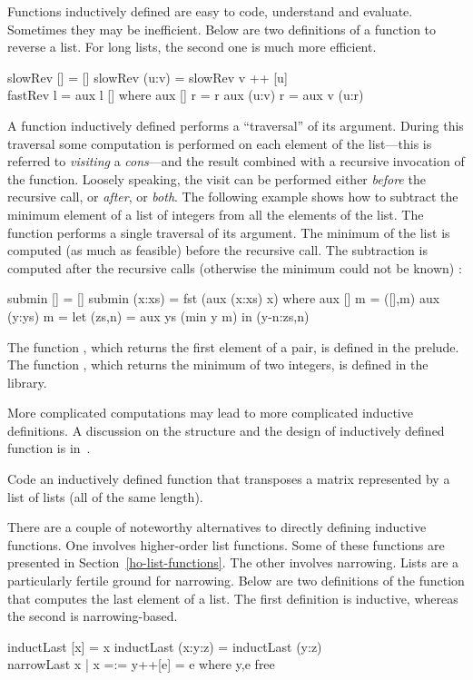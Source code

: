 Functions inductively defined are easy
to code, understand and evaluate.  Sometimes they may be inefficient.
Below are two definitions of a function to reverse a list.
For long lists, the second one is much more efficient.
%
\begin{prog}
slowRev [] = []
slowRev (u:v) = slowRev v ++ [u] \\[-2ex]
fastRev l = aux l []
  where aux [] r = r
        aux (u:v) r = aux v (u:r)
\end{prog}
%
A function inductively defined performs a ``traversal'' of its argument.
During this traversal some computation is performed on each
element of the list---this is referred to \emph{visiting}
a \emph{cons}---and the result combined with a
recursive invocation of the function.
Loosely speaking, the visit
can be performed either \emph{before} the recursive call,
or \emph{after}, or \emph{both}.
The following example shows how to subtract the minimum element of
a list of integers from all the elements of the list.
The function performs a single traversal of its argument.
The minimum of the list is computed (as much as feasible) before
the recursive call.
The subtraction is computed after the recursive
calls (otherwise the minimum could not be known)
:
%
\begin{prog}
submin [] = []
submin (x:xs) = fst (aux (x:xs) x)
  where aux []     m = ([],m)
        aux (y:ys) m = let (zs,n) = aux ys (min y m)
                        in (y-n:zs,n)
\end{prog}
%
The function , which returns the first element of a pair,
is defined in the prelude.
The function , which returns the minimum of two
integers, is defined in the  library.

More complicated computations may lead to more complicated
inductive definitions. A discussion on the structure
and the design of inductively defined function is in~\cite{Antoy92ALP}.
%
\begin{exercise}
Code an inductively defined function that transposes a matrix
represented by a list of lists (all of the same length).
\end{exercise}
%
There are a couple of noteworthy alternatives to directly defining
inductive functions.  One involves higher-order list functions.
Some of these functions are presented in Section~\ref{ho-list-functions}.
The other involves narrowing.
Lists are a particularly fertile ground for narrowing.
Below are two definitions of the function that computes the
last element of a list.  The first definition is inductive,
whereas the second is narrowing-based. 
%
\begin{prog}
inductLast [x] = x
inductLast (x:y:z) = inductLast (y:z) \\[-2ex]
narrowLast x | x =:= y++[e] = e where y,e free
\end{prog}
%
\vspace*{-3ex}

